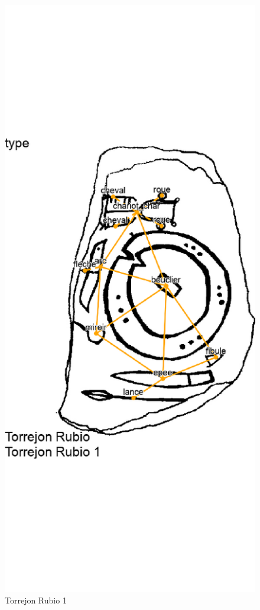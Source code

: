 \documentclass[article]{jss}\usepackage{knitr}
\begin{document}
\begin{figure}[H]
{\centering \includegraphics[width=\maxwidth]{figure/unnamed-chunk-10-1} 

}

\caption{\label{fig:figs}Torrejon Rubio 1}\label{fig:unnamed-chunk-10}
\end{figure}
\end{document}
